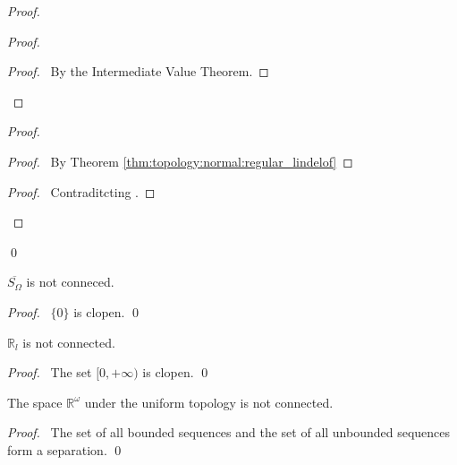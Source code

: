 \begin{proof}
\pf
{}
\begin{proof}
  \begin{proof}
    \pf\ By the Intermediate Value Theorem.
  \end{proof}
\end{proof}
\begin{proof}
  \begin{proof}
    \pf\ By Theorem \ref{thm:topology:normal:regular_lindelof}
  \end{proof}
  \qedstep
  \begin{proof}
    \pf\ Contraditcting .
  \end{proof}
\end{proof}
\qed
\end{proof}

\begin{prop}
 $\overline{S_\Omega}$ is not conneced.
\end{prop}

\begin{proof}
 \pf\ $\{0\}$ is clopen. \qed
\end{proof}

\begin{prop}
 $\mathbb{R}_l$ is not connected.
\end{prop}

\begin{proof}
\pf\ The set $[0, + \infty)$ is clopen. \qed
\end{proof}

\begin{prop}
 The space $\mathbb{R}^\omega$ under the uniform topology is not connected.
\end{prop}

\begin{proof}
\pf\ The set of all bounded sequences and the set of all unbounded sequences
form a separation. \qed
\end{proof}

